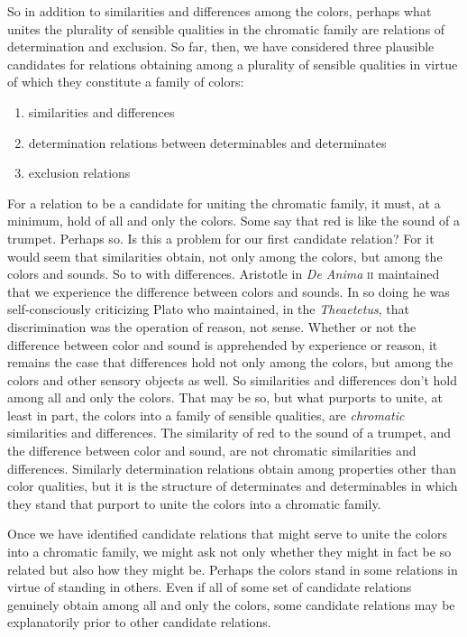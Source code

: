 \documentclass[12pt]{article}
\begin{document}
So in addition to similarities and differences among the colors, perhaps what unites the plurality of sensible qualities in the chromatic family are relations of determination and exclusion. So far, then, we have considered three plausible candidates for relations obtaining among a plurality of sensible qualities in virtue of which they constitute a family of colors:
\begin{enumerate}
	\item similarities and differences
	\item determination relations between determinables and determinates
	\item exclusion relations
\end{enumerate}
For a relation to be a candidate for uniting the chromatic family, it must, at a minimum, hold of all and only the colors. Some say that red is like the sound of a trumpet. Perhaps so. Is this a problem for our first candidate relation? For it would seem that similarities obtain, not only among the colors, but among the colors and sounds. So to with differences. Aristotle in \emph{De Anima} \textsc{ii} maintained that we experience the difference between colors and sounds. In so doing he was self-consciously criticizing Plato who maintained, in the \emph{Theaetetus}, that discrimination was the operation of reason, not sense. Whether or not the difference between color and sound is apprehended by experience or reason, it remains the case that differences hold not only among the colors, but among the colors and other sensory objects as well. So similarities and differences don't hold among all and only the colors. That may be so, but what purports to unite, at least in part, the colors into a family of sensible qualities, are \emph{chromatic} similarities and differences. The similarity of red to the sound of a trumpet, and the difference between color and sound, are not chromatic similarities and differences. Similarly determination relations obtain among properties other than color qualities, but it is the structure of determinates and determinables in which they stand that purport to unite the colors into a chromatic family.

Once we have identified candidate relations that might serve to unite the colors into a chromatic family, we might ask not only whether they might in fact be so related but also how they might be. Perhaps the colors stand in some relations in virtue of standing in others. Even if all of some set of candidate relations genuinely obtain among all and only the colors, some candidate relations may be explanatorily prior to other candidate relations.
\end{document}
